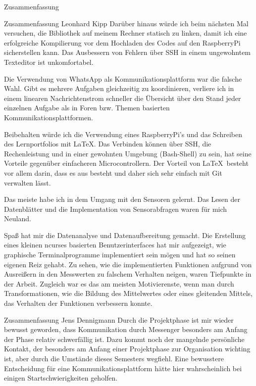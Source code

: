 \documentclass[12pt]{report}
\begin{document}
\begin{section}{Zusammenfassung}
\begin{subsection}{Zusammenfassung Leonhard Kipp}
    Darüber hinaus würde ich beim nächsten Mal versuchen, die \wiringPi{}
    Bibliothek auf meinem Rechner statisch zu linken, damit ich eine
    erfolgreiche Kompilierung vor dem Hochladen des Codes auf den RaspberryPi
    sicherstellen kann. Das Ausbessern von Fehlern über SSH in einem ungewohntem
    Texteditor ist unkomfortabel.

    Die Verwendung von WhatsApp als Kommunikationsplattform war die falsche
    Wahl. Gibt es mehrere Aufgaben gleichzeitig zu koordinieren, verliere ich in
    einem linearen Nachrichtenstrom schneller die Übersicht über den Stand jeder
    einzelnen Aufgabe als in Foren bzw. Themen basierten Kommunikationsplattformen.

    Beibehalten würde ich die Verwendung eines RaspberryPi's und das Schreiben
    des Lernportfolios mit \LaTeX. Das Verbinden
    können über SSH, die Rechenleistung und in einer gewohnten Umgebung
    (Bash-Shell) zu sein, hat seine Vorteile gegenüber einfacheren Microcontrollern.
    Der Vorteil von \LaTeX\ besteht vor allem darin, dass es aus 
    besteht und daher sich sehr einfach mit Git verwalten lässt.

    Das meiste habe ich in dem Umgang mit den Sensoren gelernt. Das Lesen der
    Datenblätter und die Implementation von Sensorabfragen waren für mich Neuland.

    Spaß hat mir die Datenanalyse und Datenaufbereitung gemacht. Die Erstellung
    eines kleinen ncurses basierten Benutzerinterfaces hat mir aufgezeigt, wie
    graphische Terminalprogramme implementiert sein mögen und hat so seinen
    eigenen Reiz gehabt. Zu sehen, wie die implementierten Funktionen
    aufgrund von Ausreißern in den Messwerten zu falschem Verhalten neigen,
    waren Tiefpunkte in der Arbeit. Zugleich war es das am meisten
    Motivierenste, wenn man durch Transformationen, wie die Bildung des
    Mittelwertes oder eines gleitenden Mittels, das Verhalten der Funktionen
    verbessern konnte.
       
  \end{subsection}
  \begin{subsection}{Zusammenfassung Jens Dennigmann}
  Durch die Projektphase ist mir wieder bewusst geworden, dass Kommunikation durch 
  Messenger besonders am Anfang der Phase relativ schwerfällig ist. Dazu kommt noch der 
  mangelnde persönliche Kontakt, der besonders am Anfang einer Projektphase zur Organisation 
  wichting ist, aber durch die Umstände dieses Semesters wegfiehl. Eine bewusstere 
  Entscheidung für eine Kommunikationsplattform hätte hier wahrscheinlich bei einigen 
  Startschwierigkeiten geholfen.
  

\end{subsection}
\end{section}
\end{document}
